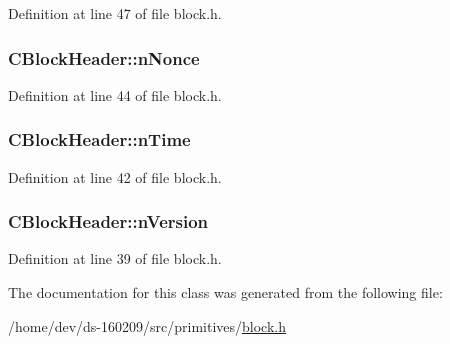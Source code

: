 Definition at line 47 of file block.\+h.

\hypertarget{class_c_block_header_a3826d43cd36673027e17ecc674450e71}{}
\subsubsection[{n\+Nonce}]{ C\+Block\+Header\+::n\+Nonce}\label{class_c_block_header_a3826d43cd36673027e17ecc674450e71}


Definition at line 44 of file block.\+h.

\hypertarget{class_c_block_header_aa435a58a8f13a304681e797366e0d56d}{}
\subsubsection[{n\+Time}]{ C\+Block\+Header\+::n\+Time}\label{class_c_block_header_aa435a58a8f13a304681e797366e0d56d}


Definition at line 42 of file block.\+h.

\hypertarget{class_c_block_header_ad64b7a76914741861f55f0f38ed66fb5}{}
\subsubsection[{n\+Version}]{ C\+Block\+Header\+::n\+Version}\label{class_c_block_header_ad64b7a76914741861f55f0f38ed66fb5}


Definition at line 39 of file block.\+h.



The documentation for this class was generated from the following file\+:\begin{DoxyCompactItemize}
\item 
/home/dev/ds-\/160209/src/primitives/\hyperlink{primitives_2block_8h}{block.\+h}\end{DoxyCompactItemize}
